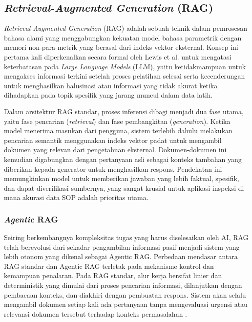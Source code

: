 \subsection{\textit{Retrieval-Augmented Generation} (RAG)}
\textit{Retrieval-Augmented Generation} (RAG) adalah sebuah teknik dalam pemrosesan bahasa alami yang menggabungkan kekuatan model bahasa parametrik dengan memori non-para-metrik yang berasal dari indeks vektor eksternal. Konsep ini pertama kali diperkenalkan secara formal oleh Lewis et al. \cite{lewis2020retrieval} untuk mengatasi keterbatasan pada \textit{Large Language Models} (LLM), yaitu ketidakmampuan untuk mengakses informasi terkini setelah proses pelatihan selesai serta kecenderungan untuk menghasilkan halusinasi atau informasi yang tidak akurat ketika dihadapkan pada topik spesifik yang jarang muncul dalam data latih.

Dalam arsitektur RAG standar, proses inferensi dibagi menjadi dua fase utama, yaitu fase pencarian (\textit{retrieval}) dan fase pembangkitan (\textit{generation}). Ketika model menerima masukan dari pengguna, sistem terlebih dahulu melakukan pencarian semantik menggunakan indeks vektor padat untuk mengambil dokumen yang relevan dari pengetahuan eksternal. Dokumen-dokumen ini kemudian digabungkan dengan pertanyaan asli sebagai konteks tambahan yang diberikan kepada generator untuk menghasilkan respons. Pendekatan ini memungkinkan model untuk memberikan jawaban yang lebih faktual, spesifik, dan dapat diverifikasi sumbernya, yang sangat krusial untuk aplikasi inspeksi di mana akurasi data SOP adalah prioritas utama.

\subsubsection{\textit{Agentic} RAG}
Seiring berkembangnya kompleksitas tugas yang harus diselesaikan oleh AI, RAG telah berevolusi dari sekadar pengambilan informasi pasif menjadi sistem yang lebih otonom yang dikenal sebagai Agentic RAG. Perbedaan mendasar antara RAG standar dan Agentic RAG terletak pada mekanisme kontrol dan kemampuan penalaran. Pada RAG standar, alur kerja bersifat linier dan deterministik yang dimulai dari proses pencarian informasi, dilanjutkan dengan pembacaan konteks, dan diakhiri dengan pembuatan respons. Sistem akan selalu mengambil dokumen setiap kali ada pertanyaan tanpa mengevaluasi urgensi atau relevansi dokumen tersebut terhadap konteks permasalahan \cite{gao2023retrieval}.


